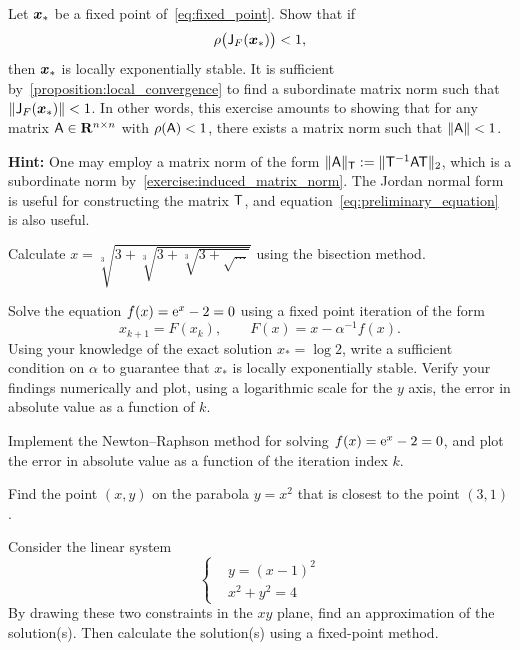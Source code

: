 \begin{exercise}
    Let $\mathbf{\boldsymbol{x}}_*$ be a fixed point of~\eqref{eq:fixed_point}.
    Show that if
    \[
        \rho\bigl(\mathsf J_F(\mathbf{\boldsymbol{x}}_*)\bigr) < 1,
    \]
    then $\mathbf{\boldsymbol{x}}_*$ is locally exponentially stable.
    It is sufficient by~\cref{proposition:local_convergence} to find a subordinate matrix norm such that $\lVert\mathsf J_F(\mathbf{\boldsymbol{x}}_*)\rVert < 1$.
    In other words, this exercise amounts to showing that for any matrix $\mathsf A \in \mathbf R^{n \times n}$ with $\rho(\mathsf A) < 1$,
    there exists a matrix norm such that $\lVert\mathsf A\rVert < 1$.

    \noindent \textbf{Hint:} One may employ a matrix norm of the form $\lVert\mathsf A\rVert_{\mathsf T} := \lVert\mathsf T^{-1} \mathsf A \mathsf T\rVert_2$,
    which is a subordinate norm by~\cref{exercise:induced_matrix_norm}.
    The Jordan normal form is useful for constructing the matrix $\mathsf T$,
    and equation~\eqref{eq:preliminary_equation} is also useful.
\end{exercise}

\begin{exercise}
    Calculate $x = \sqrt[3]{3 + \sqrt[3]{3 + \sqrt[3]{3 + \sqrt{\dots}}}}$ using the bisection method.
\end{exercise}

\begin{exercise}
    Solve the equation $f(x) = \mathrm e^x - 2 = 0$ using a fixed point iteration of the form
    \[
        x_{k+1} = F(x_k), \qquad
        F(x) = x - \alpha^{-1} f(x).
    \]
    Using your knowledge of the exact solution $x_* = \log 2$,
    write a sufficient condition on $\alpha$ to guarantee that $x_*$ is locally exponentially stable.
    Verify your findings numerically and plot,
    using a logarithmic scale for the $y$ axis,
    the error in absolute value as a function of $k$.
\end{exercise}

\begin{exercise}
    Implement the Newton--Raphson method for solving $f(x) = \mathrm e^x - 2 = 0$,
    and plot the error in absolute value as a function of the iteration index $k$.
\end{exercise}

\begin{exercise}
    Find the point $(x, y)$ on the parabola $y = x^2$ that is closest to the point $(3, 1)$.
\end{exercise}

\begin{exercise}
    Consider the linear system
    \begin{equation*}
        \left \{
            \begin{aligned}
                &y = (x-1)^2 \\
                &x^2 + y^2 = 4
            \end{aligned}
        \right.
    \end{equation*}
    By drawing these two constraints in the $xy$ plane,
    find an approximation of the solution(s).
    Then calculate the solution(s) using a fixed-point method.
\end{exercise}

